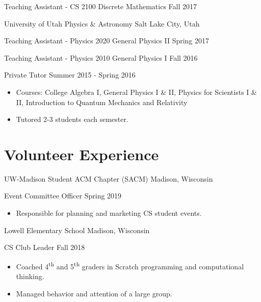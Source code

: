 \begin{tab2} Teaching Assistant - CS 2100 Discrete Mathematics \> Fall 2017 \end{tab2}
\blockskip

\begin{tab1} University of Utah Physics \& Astronomy \> Salt Lake City, Utah \end{tab1}

\begin{tab2} Teaching Assistant - Physics 2020 General Physics II \> Spring 2017 \end{tab2}

\begin{tab2} Teaching Assistant - Physics 2010 General Physics I \> Fall 2016 \end{tab2}

\begin{tab2} Private Tutor \> Summer 2015 - Spring 2016 \end{tab2}
\begin{itemize}
    \item Courses: College Algebra I, General Physics I \& II, Physics for Scientists I \& II, Introduction to Quantum Mechanics and Relativity
    \item Tutored 2-3 students each semester.
\end{itemize}


\section*{Volunteer Experience}

\begin{tab1} UW-Madison Student ACM Chapter (SACM) \> Madison, Wisconsin \end{tab1}

\begin{tab2} Event Committee Officer \> Spring 2019 \end{tab2}
\begin{itemize}
    \item Responsible for planning and marketing CS student events.
\end{itemize}

\blockskip

\begin{tab1} Lowell Elementary School \> Madison, Wisconsin \end{tab1}

\begin{tab2} CS Club Leader \> Fall 2018 \end{tab2}
\begin{itemize}
    \item Coached 4\textsuperscript{th} and 5\textsuperscript{th} graders in Scratch programming and computational thinking.
    \item Managed behavior and attention of a large group.
\end{itemize}

